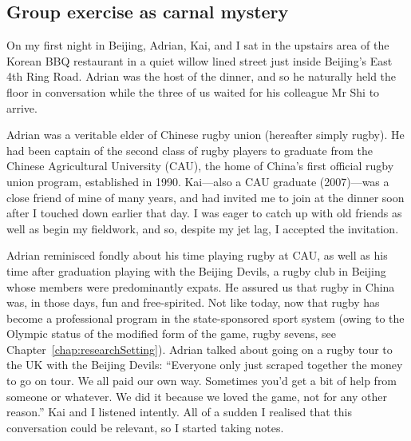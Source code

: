                                           \begin{CJK}{UTF8}{gbsn}

\section{Group exercise as carnal mystery\label{sect:adrian}}


On my first night in Beijing, Adrian, Kai, and I sat in the upstairs area of the Korean BBQ restaurant in a quiet willow lined street just inside Beijing's East 4th Ring Road.  Adrian was the host of the dinner, and so he naturally held the floor in conversation while the three of us waited for his colleague Mr Shi to arrive.

Adrian was a veritable elder of Chinese rugby union (hereafter simply rugby).  He had been captain of the second class of rugby players to graduate from the Chinese Agricultural University (CAU), the home of China's first official rugby union program, established in 1990.  Kai---also a CAU graduate (2007)---was a close friend of mine of many years, and had invited me to join at the dinner soon after I touched down earlier that day.  I was eager to catch up with old friends as well as begin my fieldwork, and so, despite my jet lag, I accepted the invitation.

Adrian reminisced fondly about his time playing rugby at CAU, as well as his time after graduation playing with the Beijing Devils, a rugby club in Beijing whose members were predominantly expats.  He assured us that rugby in China was, in those days, fun and free-spirited.  Not like today, now that rugby has become a professional program in the state-sponsored sport system (owing to the Olympic status of the modified form of the game, rugby sevens, see Chapter~\ref{chap:researchSetting}).  Adrian talked about going on a rugby tour to the UK with the Beijing Devils:  ``Everyone only just scraped together the money to go on tour.  We all paid our own way. Sometimes you'd get a bit of help from someone or whatever. We did it because we loved the game, not for any other reason.''   Kai and I listened intently.  All of a sudden I realised that this conversation could be relevant, so I started taking notes.


\end{CJK}
